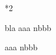 \documentclass[parskip=full]{scrreprt}%
\begin{document}
\the\dp\blabox

\blindtext

\the\dimexpr 30pt*2\relax


\def\bla{fafa}

\expandafter\ifx\csname bla\endcsname\@empty\relax
aaa
\else
nbbb
\fi

\expandafter\expandafter\expandafter\ifx{}\@empty\relax
aaa
\else
nbbb
\fi
\end{document}
